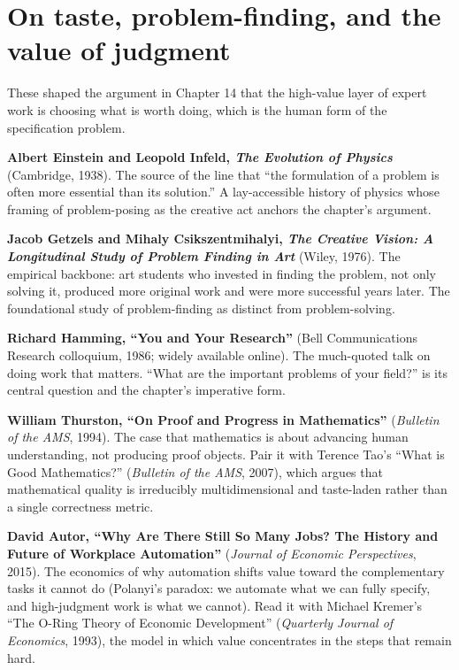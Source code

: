 \section*{On taste, problem-finding, and the value of judgment}

These shaped the argument in Chapter 14 that the high-value layer of expert work is choosing what is worth doing, which is the human form of the specification problem.

\textbf{Albert Einstein and Leopold Infeld, \textit{The Evolution of Physics}} (Cambridge, 1938). The source of the line that ``the formulation of a problem is often more essential than its solution.'' A lay-accessible history of physics whose framing of problem-posing as the creative act anchors the chapter's argument.

\textbf{Jacob Getzels and Mihaly Csikszentmihalyi, \textit{The Creative Vision: A Longitudinal Study of Problem Finding in Art}} (Wiley, 1976). The empirical backbone: art students who invested in finding the problem, not only solving it, produced more original work and were more successful years later. The foundational study of problem-finding as distinct from problem-solving.

\textbf{Richard Hamming, ``You and Your Research''} (Bell Communications Research colloquium, 1986; widely available online). The much-quoted talk on doing work that matters. ``What are the important problems of your field?'' is its central question and the chapter's imperative form.

\textbf{William Thurston, ``On Proof and Progress in Mathematics''} (\textit{Bulletin of the AMS}, 1994). The case that mathematics is about advancing human understanding, not producing proof objects. Pair it with Terence Tao's ``What is Good Mathematics?'' (\textit{Bulletin of the AMS}, 2007), which argues that mathematical quality is irreducibly multidimensional and taste-laden rather than a single correctness metric.

\textbf{David Autor, ``Why Are There Still So Many Jobs? The History and Future of Workplace Automation''} (\textit{Journal of Economic Perspectives}, 2015). The economics of why automation shifts value toward the complementary tasks it cannot do (Polanyi's paradox: we automate what we can fully specify, and high-judgment work is what we cannot). Read it with Michael Kremer's ``The O-Ring Theory of Economic Development'' (\textit{Quarterly Journal of Economics}, 1993), the model in which value concentrates in the steps that remain hard.

